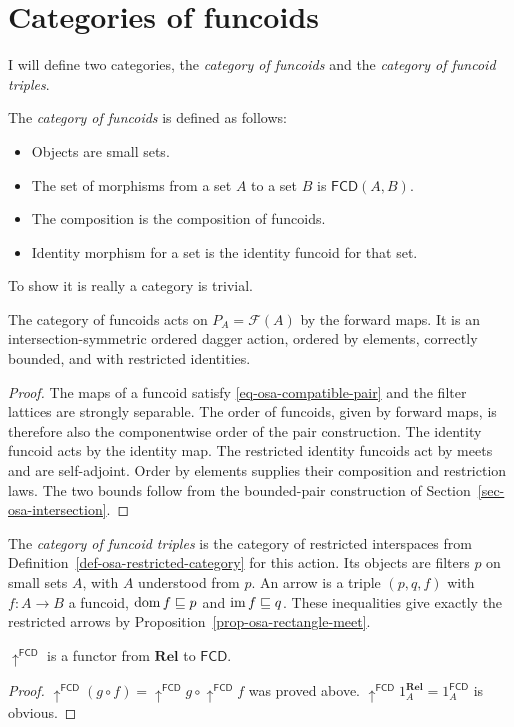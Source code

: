 \section{Categories of funcoids}

I will define two categories, the \emph{category of funcoids} and
the \emph{category of funcoid triples}.

The \emph{category of funcoids} is defined
as follows:
\begin{itemize}
\item Objects are small sets.
\item The set of morphisms from a set $A$ to a set $B$ is $\mathsf{FCD}(A,B)$.
\item The composition is the composition of funcoids.
\item Identity morphism for a set is the identity funcoid for that set.
\end{itemize}
To show it is really a category is trivial.

\begin{prop}\label{prop-fcd-osa}
The category of funcoids acts on $P_A=\mathscr F(A)$ by the forward
maps. It is an intersection-symmetric ordered dagger action,
ordered by elements, correctly bounded, and with restricted identities.
\end{prop}
\begin{proof}
The maps of a funcoid satisfy \eqref{eq-osa-compatible-pair} and the
filter lattices are strongly separable. The order of funcoids, given
by forward maps, is therefore also the componentwise order of the
pair construction. The identity funcoid acts by the identity map.
The restricted identity funcoids act by meets and are self-adjoint.
Order by elements supplies their composition and restriction laws.
The two bounds follow from the bounded-pair construction of
Section~\ref{sec-osa-intersection}.
\end{proof}

The \emph{category of funcoid
triples} is the category of restricted interspaces from
Definition~\ref{def-osa-restricted-category} for this action.
Its objects are filters $p$ on small sets $A$, with $A$ understood
from $p$. An arrow is a triple $(p,q,f)$ with $f:A\to B$ a funcoid,
$\operatorname{dom} f\sqsubseteq p$ and $\operatorname{im} f\sqsubseteq q$. These inequalities
give exactly the restricted arrows by Proposition~\ref{prop-osa-rectangle-meet}.

\begin{prop}
$\uparrow^{\mathsf{FCD}}$ is a functor from $\mathbf{Rel}$ to
$\mathsf{FCD}$.\end{prop}
\begin{proof}
$\uparrow^{\mathsf{FCD}}(g\circ
f)=\uparrow^{\mathsf{FCD}}g\circ\uparrow^{\mathsf{FCD}}f$
was proved above.
$\uparrow^{\mathsf{FCD}}1_{A}^{\mathbf{Rel}}=1_{A}^{\mathsf{FCD}}$
is obvious.
\end{proof}


